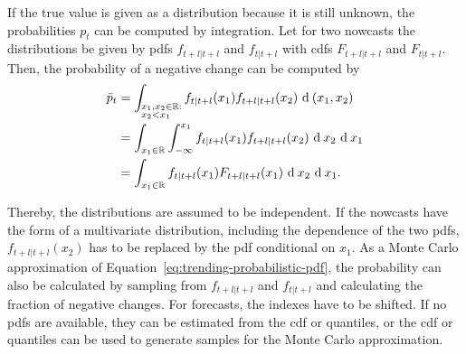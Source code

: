 If the true value is given as a distribution because it is still unknown, the probabilities $p_t$ can be computed by integration.
Let for two nowcasts the distributions be given by \acp{pdf} $f_{t+l|t+l}$ and $f_{t|t+l}$ with \acp{cdf}  $F_{t+l|t+l}$ and $F_{t|t+l}$.
Then, the probability of a negative change can be computed by
\begin{align}
    \bar{p}_t
        &= \int_{\begin{subarray}{l}x_1, x_2 \in \R: \\ x_2 < x_1\end{subarray}} f_{t|t+l} (x_1) f_{t+l|t+l} (x_2)  \ \textrm{d} \: (x_1, x_2) \nonumber\\
        &= \int_{x_1 \in \R} \int_{-\infty}^{x_1} f_{t|t+l} (x_1) f_{t+l|t+l} (x_2)  \ \textrm{d} \: x_2 \ \textrm{d} \: x_1 \nonumber\\
        &= \int_{x_1 \in \R} f_{t|t+l} (x_1) F_{t+l|t+l} (x_1)  \ \textrm{d} \: x_2 \ \textrm{d} \: x_1 \label{eq:trending-probabilistic-pdf}.
\end{align} 

Thereby, the distributions are assumed to be independent.
If the nowcasts have the form of a multivariate distribution, including the dependence of the two \acp{pdf}, $f_{t+l|t+l} (x_2)$ has to be replaced by the \ac{pdf} conditional on $x_1$.
As a Monte Carlo approximation of Equation~\eqref{eq:trending-probabilistic-pdf}, the probability can also be calculated by sampling from $f_{t+l|t+l}$ and $f_{t|t+l}$ and calculating the fraction of negative changes.
For forecasts, the indexes have to be shifted.
If no \acp{pdf} are available, they can be estimated from the \ac{cdf} or quantiles, or the \ac{cdf} or quantiles can be used to generate samples for the Monte Carlo approximation.
